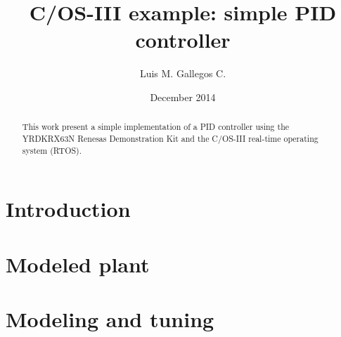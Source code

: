 \documentclass[titlepage]{article}%
\begin{document}
\title{{\textmu}C/OS-III example: simple PID controller}
\author{Luis M. Gallegos C.}
\date{December 2014}
\maketitle

\begin{abstract}
    This work present a simple implementation of a PID controller using the YRDKRX63N Renesas Demonstration Kit and the {\textmu}C/OS-III real-time operating system (RTOS).
\end{abstract}

\section{Introduction} %
\label{sec:introduction}






\section{Modeled plant} %
\label{sec:modeled_plant}






\section{Modeling and tuning} %
\label{sec:modeling_and_tuning}



\end{document}
